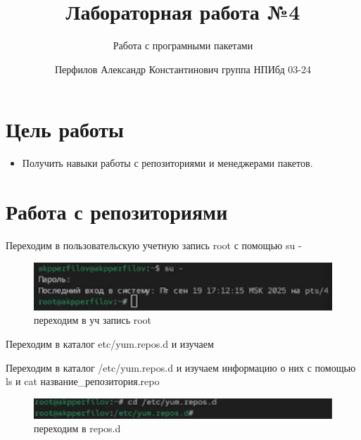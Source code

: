 \documentclass[
  english,
  russian,
  12pt,
  a4paper,
  DIV=11,
  numbers=noendperiod]{scrreprt}
\title{Лабораторная работа №4}
\subtitle{Работа с програмными пакетами}
\author{Перфилов Александр Константинович \textbar{} группа НПИбд 03-24}
\date{}
\providecommand{\tightlist}{%
  \setlength{\itemsep}{0pt}\setlength{\parskip}{0pt}}
\renewcommand*\contentsname{Содержание}
\newcommand\contentsname{Содержание}
\begin{document}
\maketitle

\renewcommand*\contentsname{Содержание}
{
\setcounter{tocdepth}{1}
\tableofcontents
}
\listoffigures
\listoftables

\chapter{Цель
работы}\label{ux446ux435ux43bux44c-ux440ux430ux431ux43eux442ux44b}

\begin{itemize}
\tightlist
\item
  Получить навыки работы с репозиториями и менеджерами пакетов.
\end{itemize}

\chapter{Работа с
репозиториями}\label{ux440ux430ux431ux43eux442ux430-ux441-ux440ux435ux43fux43eux437ux438ux442ux43eux440ux438ux44fux43cux438}

Переходим в пользовательскую учетную запись root с помощью su -

\begin{figure}

{\centering \includegraphics[width=0.71\linewidth,height=\textheight,keepaspectratio]{image/1.jpg}

}

\caption{переходим в уч запись root}

\end{figure}%

Переходим в каталог etc/yum.repos.d и изучаем

Переходим в каталог /etc/yum.repos.d и изучаем информацию о них с
помощью ls и cat название\_репозитория.repo

\begin{figure}

{\centering \includegraphics[width=0.2\linewidth,height=\textheight,keepaspectratio]{image/2.jpg}

}

\caption{переходим в repos.d}

\end{figure}%
\end{document}
